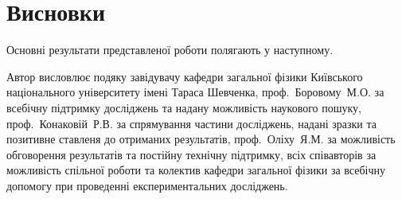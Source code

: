 \chapter*{Висновки}						%


Основні результати представленої роботи полягають у наступному.


Автор висловлює подяку
завідувачу кафедри загальної фізики Київського національного університету імені Тараса Шевченка,
проф.~Боровому~М.\:О. за всебічну підтримку досліджень та надану можливість наукового пошуку,
проф.~Конаковій~Р.\:В. за спрямування частини досліджень, надані зразки та позитивне ставленя до отриманих результатів,
проф.~Оліху~Я.\:М. за можливість обговорення результатів та постійну технічну підтримку,
всіх співавторів за можливість спільної роботи
та колектив кафедри загальної фізики за всебічну допомогу при проведенні експериментальних досліджень.

